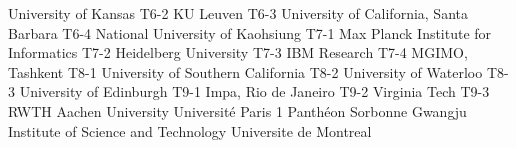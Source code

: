 \begin{multicols}{2}
{University of Kansas}
{T6-2}
{}
{KU Leuven}
{T6-3}
{}
{University of California, Santa Barbara}
{T6-4}
{}
{National University of Kaohsiung}
{T7-1}
{}
{Max Planck Institute for Informatics}
{T7-2}
{}
{Heidelberg University}
{T7-3}
{}
{IBM Research}
{T7-4}
{}
{MGIMO, Tashkent}
{T8-1}
{}
{University of Southern California}
{T8-2}
{}
{University of Waterloo}
{T8-3}
{}
{University of Edinburgh}
{T9-1}
{}
{Impa, Rio de Janeiro}
{T9-2}
{}
{Virginia Tech}
{T9-3}
{}
{RWTH Aachen University}
{}
{}
{Université Paris 1 Panthéon Sorbonne}
{}
{}
{Gwangju Institute of Science and Technology}
{}
{}
{Universite de Montreal}
{}
{}
\end{multicols}

